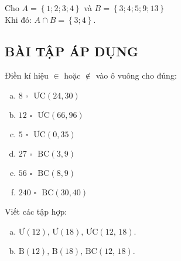 \begin{tomtat}
\begin{itemize}
\begin{vd}
Cho $A = \left\{ {1;2;3;4} \right\}$ và $B = \left\{ {3;4;5;9;13} \right\}$\\
Khi đó: $A \cap B = \left\{ {3;4} \right\}$.
\end{vd}
\end{itemize}

\end{tomtat}
\subsection{BÀI TẬP ÁP DỤNG}
\begin{bt} 
Điền kí hiệu $\in$ hoặc $\notin$ vào ô vuông cho đúng:
\begin{multicols}{2}
\begin{enumerate}[a)]
\item $\text{8 }\square\text{ }\mathrm{\text{ƯC}\left( {24,30} \right)}$
\item $\text{12 }\square\text{ }\mathrm{\text{ƯC}\left( {66,96} \right)}$
\item $\text{5 }\square\text{ }\mathrm{\text{ƯC}\left( {0,35} \right)}$
\item $\text{27 }\square\text{ }\mathrm{\text{BC}\left( {3,9} \right)}$
\item $\text{56 }\square\text{ }\mathrm{\text{BC}\left( {8,9} \right)}$
\item $\text{240 }\square\text{ }\mathrm{\text{BC}\left( {30,40} \right)}$
\end{enumerate}
\end{multicols}
\end{bt}   \begin{bt}
Viết các tập hợp:
\begin{enumerate}[a)]
\item $\text{Ư}\left( {12} \right),\,\text{Ư}\left( {18} \right),\,\text{ƯC}\left( {12,\,18} \right)$.
\item $\text{B}\left( {12} \right),\,\text{B}\left( {18} \right),\,\text{BC}\left( {12,\,18} \right)$.
\end{enumerate}

\end{bt}
